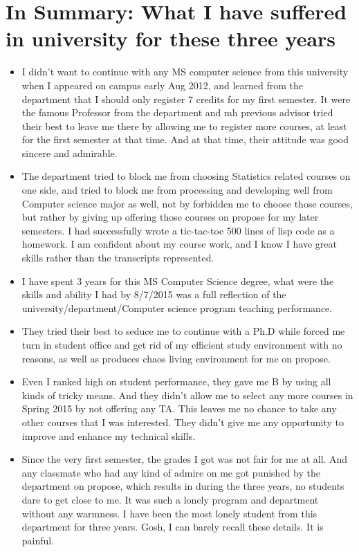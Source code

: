 \documentclass[9pt,b5paper]{article}
\begin{document}
\section{In Summary: What I have suffered in university for these three years}
\label{sec-7}
\begin{itemize}
\item I didn't want to continue with any MS computer science from this university when I appeared on campus early Aug 2012, and learned from the department that I should only register 7 credits for my first semester. It were the famous Professor from the department and mh previous advisor tried their best to leave me there by allowing me to register more courses, at least for the first semester at that time. And at that time, their attitude was good sincere and admirable.
\item The department tried to block me from choosing Statistics related courses on one side, and tried to block me from processing and developing well from Computer science major as well, not by forbidden me to choose those courses, but rather by giving up offering those courses on propose for my later semesters. I had successfully wrote a tic-tac-toe 500 lines of lisp code as a homework. I am confident about my course work, and I know I have great skills rather than the transcripts represented.
\item I have spent 3 years for this MS Computer Science degree, what were the skills and ability I had by 8/7/2015 was a full reflection of the university/department/Computer science program teaching performance.
\item They tried their best to seduce me to continue with a Ph.D while forced me turn in student office and get rid of my efficient study environment with no reasons, as well as produces chaos living environment for me on propose.
\item Even I ranked high on student performance, they gave me B by using all kinds of tricky means. And they didn't allow me to select any more courses in Spring 2015 by not offering any TA. This leaves me no chance to take any other courses that I was interested. They didn't give me any opportunity to improve and enhance my technical skills.
\item Since the very first semester, the grades I got was not fair for me at all. And any classmate who had any kind of admire on me got punished by the department on propose, which results in during the three years, no students dare to get close to me. It was such a lonely program and department without any warmness. I have been the most lonely student from this department for three years. Gosh, I can barely recall these details. It is painful.

\end{itemize}
\end{document}
